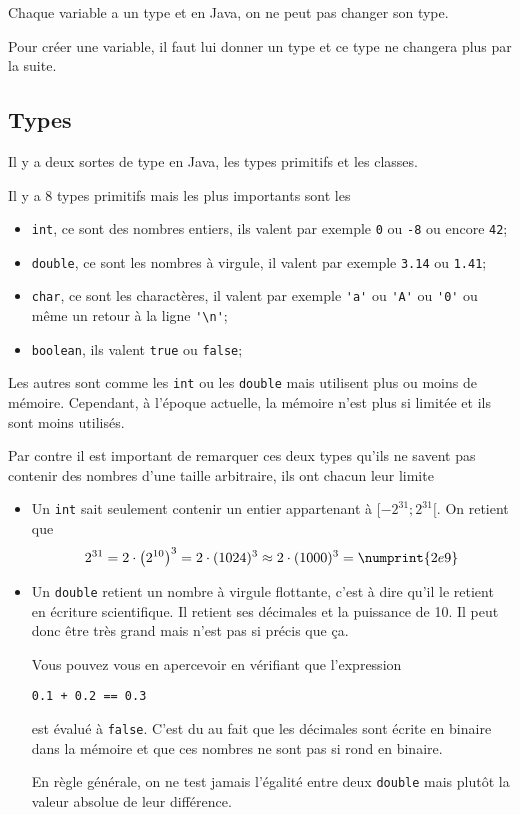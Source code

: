 Chaque variable a un type et en Java, on ne peut pas changer son type.

Pour créer une variable, il faut lui donner un type et ce type ne changera
plus par la suite.
\subsection{Types}
Il y a deux sortes de type en Java, les types primitifs et les classes.

Il y a 8 types primitifs mais les plus importants sont les
\begin{itemize}
  \item \verb|int|, ce sont des nombres entiers, ils valent par exemple
    \verb|0| ou \verb|-8| ou encore \verb|42|;
  \item \verb|double|, ce sont les nombres à virgule, il valent par exemple
    \verb|3.14| ou \verb|1.41|;
  \item \verb|char|, ce sont les charactères, il valent par exemple \verb|'a'|
    ou \verb|'A'| ou \verb|'0'| ou même un retour à la ligne \verb|'\n'|;
  \item \verb|boolean|, ils valent \verb|true| ou \verb|false|;
\end{itemize}
Les autres sont comme les \verb|int| ou les \verb|double| mais utilisent plus
ou moins de mémoire. Cependant, à l'époque actuelle, la mémoire n'est plus
si limitée et ils sont moins utilisés.

Par contre il est important de remarquer ces deux types qu'ils ne savent
pas contenir des nombres d'une taille arbitraire, ils ont chacun leur limite
\begin{itemize}
  \item Un \verb|int| sait seulement contenir un entier appartenant à
    $[-2^{31}; 2^{31}[$. On retient que
    \[ 2^{31} = 2 \cdot \left(2^{10}\right)^3 = 2 \cdot (1024)^3
    \approx 2 \cdot (1000)^3 = \numprint{2e9} \]
  \item Un \verb|double| retient un nombre à virgule flottante, c'est à dire
    qu'il le retient en écriture scientifique.
    Il retient ses décimales et la puissance de 10.
    Il peut donc être très grand mais n'est pas si précis que ça.

    Vous pouvez vous en apercevoir en vérifiant que l'expression
    \begin{lstlisting}
0.1 + 0.2 == 0.3
    \end{lstlisting}
    est évalué à \verb|false|.
    C'est du au fait que les décimales sont écrite en binaire dans la mémoire
    et que ces nombres ne sont pas si rond en binaire.

    En règle générale, on ne test jamais l'égalité entre deux \verb|double|
    mais plutôt la valeur absolue de leur différence.
\end{itemize}

